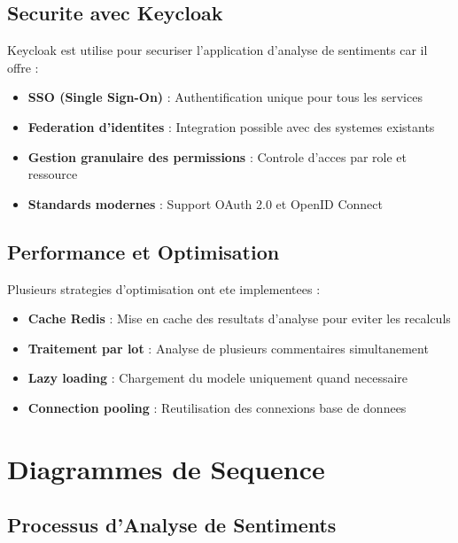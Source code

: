 \subsection{Securite avec Keycloak}

Keycloak est utilise pour securiser l'application d'analyse de sentiments car il offre :

\begin{itemize}
    \item \textbf{SSO (Single Sign-On)} : Authentification unique pour tous les services
    \item \textbf{Federation d'identites} : Integration possible avec des systemes existants
    \item \textbf{Gestion granulaire des permissions} : Controle d'acces par role et ressource
    \item \textbf{Standards modernes} : Support OAuth 2.0 et OpenID Connect
\end{itemize}

\subsection{Performance et Optimisation}

Plusieurs strategies d'optimisation ont ete implementees :

\begin{itemize}
    \item \textbf{Cache Redis} : Mise en cache des resultats d'analyse pour eviter les recalculs
    \item \textbf{Traitement par lot} : Analyse de plusieurs commentaires simultanement
    \item \textbf{Lazy loading} : Chargement du modele uniquement quand necessaire
    \item \textbf{Connection pooling} : Reutilisation des connexions base de donnees
\end{itemize}

\section{Diagrammes de Sequence}

\subsection{Processus d'Analyse de Sentiments}

